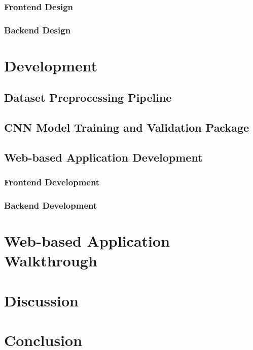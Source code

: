 \documentclass{BachelorBUI}
\begin{document}
        \subsubsection{Frontend Design}
        \subsubsection{Backend Design}

\section{Development}
    \subsection{Dataset Preprocessing Pipeline}
    \subsection{CNN Model Training and Validation Package}

    \subsection{Web-based Application Development}
        \subsubsection{Frontend Development}
        \subsubsection{Backend Development}

\section{Web-based Application Walkthrough}

\section{Discussion}

\section{Conclusion}

\clearpage
\printbibliography
\end{document}
